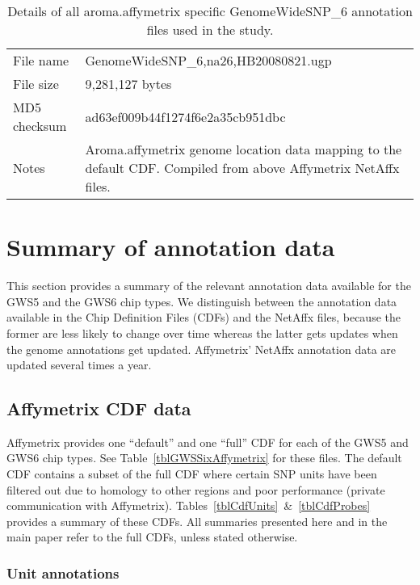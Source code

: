 \documentclass[10pt,a4paper]{article}
\begin{document}
\begin{table}[hp]
\begin{center}
\begin{tabular}{lp{}}
\hline
File name    & GenomeWideSNP\_6,na26,HB20080821.ugp \\
File size    & 9,281,127 bytes \\
MD5 checksum & ad63ef009b44f1274f6e2a35cb951dbc \\
Notes        & Aroma.affymetrix genome location data mapping to the default CDF.  Compiled from above Affymetrix NetAffx files. \\
\hline
\end{tabular}
\end{center}
\caption{Details of all aroma.affymetrix specific GenomeWideSNP\_6 annotation files used in the study.}
\label{tblGWSSixAromaAffymetrix}
\end{table}



\clearpage
\section{Summary of annotation data}

This section provides a summary of the relevant annotation data available for the GWS5 and the GWS6 chip types.  We distinguish between the annotation data available in the Chip Definition Files (CDFs) and the NetAffx files, because the former are less likely to change over time whereas the latter gets updates when the genome annotations get updated.  Affymetrix' NetAffx annotation data are updated several times a year.

\subsection{Affymetrix CDF data}

Affymetrix provides one ``default'' and one ``full'' CDF for each of the GWS5 and GWS6 chip types.  See Table~\ref{tblGWSSixAffymetrix} for these files.
The default CDF contains a subset of the full CDF where certain SNP units have been filtered out due to homology to other regions and poor performance (private communication with Affymetrix).
Tables~\ref{tblCdfUnits}~\&~\ref{tblCdfProbes} provides a summary of these CDFs.
All summaries presented here and in the main paper refer to the full CDFs, unless stated otherwise.

\subsubsection{Unit annotations}
\end{document}
